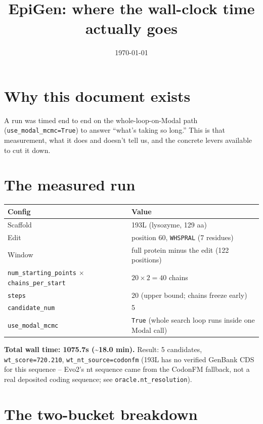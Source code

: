 \documentclass[11pt]{article}
\title{EpiGen: where the wall-clock time actually goes}
\author{}
\date{\today}
\begin{document}
\maketitle

\section*{Why this document exists}

A run was timed end to end on the whole-loop-on-Modal path
(\texttt{use\_modal\_mcmc=True}) to answer ``what's taking so long.'' This is
that measurement, what it does and doesn't tell us, and the concrete levers
available to cut it down.

\tableofcontents

\section{The measured run}

\begin{center}
\begin{tabular}{@{}ll@{}}
\toprule
Config & Value \\
\midrule
Scaffold & 193L (lysozyme, 129 aa) \\
Edit & position 60, \texttt{WHSPRAL} (7 residues) \\
Window & full protein minus the edit (122 positions) \\
\texttt{num\_starting\_points} $\times$ \texttt{chains\_per\_start} & $20 \times 2 = 40$ chains \\
\texttt{steps} & 20 (upper bound; chains freeze early) \\
\texttt{candidate\_num} & 5 \\
\texttt{use\_modal\_mcmc} & \texttt{True} (whole search loop runs inside one Modal call) \\
\bottomrule
\end{tabular}
\end{center}

\textbf{Total wall time: 1075.7s (\textasciitilde 18.0 min).} Result:
5 candidates, \texttt{wt\_score=720.210}, \texttt{wt\_nt\_source=codonfm}
(193L has no verified GenBank CDS for this sequence -- Evo2's nt sequence
came from the CodonFM fallback, not a real deposited coding sequence; see
\texttt{oracle.nt\_resolution}).

\section{The two-bucket breakdown}
\end{document}
